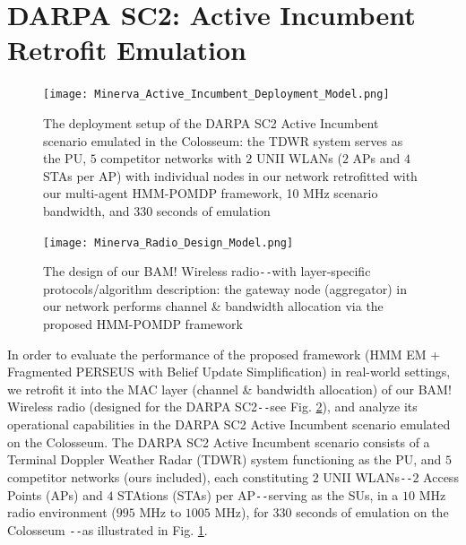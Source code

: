 \documentclass[12pt, draftcls, onecolumn]{IEEEtran}
\begin{document}
\section{DARPA SC2: Active Incumbent Retrofit Emulation}\label{Y}
\begin{figure} [htb]
    \centerline{
    \texttt{[image: Minerva\_Active\_Incumbent\_Deployment\_Model.png]}}
    \caption{The deployment setup of the DARPA SC2 Active Incumbent scenario emulated in the Colosseum: the TDWR system serves as the PU, $5$ competitor networks with $2$ UNII WLANs ($2$ APs and $4$ STAs per AP) with individual nodes in our network retrofitted with our multi-agent HMM-POMDP framework, 10 MHz scenario bandwidth, and 330 seconds of emulation}
    \label{fig: Y. 0}
\end{figure}
\begin{figure} [htb]
    \centerline{
    \texttt{[image: Minerva\_Radio\_Design\_Model.png]}}
    \caption{The design of our BAM! Wireless radio\texttt{-{}-}with layer-specific protocols/algorithm description: the gateway node (aggregator) in our network performs channel \& bandwidth allocation via the proposed HMM-POMDP framework}
    \label{fig: Y. 1}
\end{figure}
In order to evaluate the performance of the proposed framework (HMM EM + Fragmented PERSEUS with Belief Update Simplification) in real-world settings, we retrofit it into the MAC layer (channel \& bandwidth allocation) of our BAM! Wireless radio (designed for the DARPA SC2\texttt{-{}-}see Fig. \ref{fig: Y. 1}), and analyze its operational capabilities in the DARPA SC2 Active Incumbent scenario emulated on the Colosseum. The DARPA SC2 Active Incumbent scenario consists of a Terminal Doppler Weather Radar (TDWR) system functioning as the PU, and $5$ competitor networks (ours included), each constituting $2$ UNII WLANs\texttt{-{}-}$2$ Access Points (APs) and $4$ STAtions (STAs) per AP\texttt{-{}-}serving as the SUs, in a $10$ MHz radio environment ($995$ MHz to $1005$ MHz), for $330$ seconds of emulation on the Colosseum \cite{DARPA:ActiveIncumbent}\texttt{-{}-}as illustrated in Fig. \ref{fig: Y. 0}.
\end{document}
